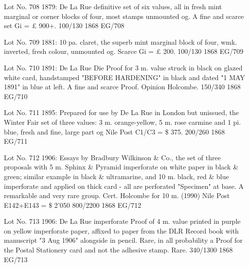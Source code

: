 \documentclass[justified]{tufte-book}
\begin{document}
%
{Lot No. 708
1879: De La Rue definitive set of six values, all in fresh mint marginal or corner blocks of four, most stamps unmounted og. A fine and scarce set Gi = £ 900+. 100/130
}%
{1868}%
{EG/708}%
{}%
{}
{}%
{}

%
{Lot No. 709
1881: 10 pa. claret, the superb mint marginal block of four, wmk. inverted, fresh colour, unmounted og. Scarce Gi = £ 200. 100/130
}%
{1868}%
{EG/709}%
{}%
{}
{}%
{}

%
{Lot No. 710
1891: De La Rue Die Proof for 3 m. value struck in black on glazed white card, handstamped "BEFORE HARDENING" in black and dated "1 MAY 1891" in blue at left. A fine and scarce Proof. Opinion Holcombe. 150/340
}%
{1868}%
{EG/710}%
{}%
{}
{}%
{}

%
{
Lot No. 711
1895: Prepared for use by De La Rue in London but unissued, the Winter Fair set of three values: 3 m. orange-yellow, 5 m. rose carmine and 1 pi. blue, fresh and fine, large part og Nile Post C1/C3 = \$ 375. 200/260
}%
{1868}%
{EG/711}%
{}%
{}
{}%
{}

%
{Lot No. 712
1906: Essays by Bradbury Wilkinson \& Co., the set of three proposals with 5 m. Sphinx \& Pyramid imperforate on white paper in black \& green; similar example in black \& ultramarine, and 10 m. black, red \& blue imperforate and applied on thick card - all are perforated "Specimen" at base. A remarkable and very rare group. Cert. Holcombe for 10 m. (1990) Nile Post E142+E143 = \$ 2'050 800/2200
}%
{1868}%
{EG/712}%
{}%
{}
{}%
{}

%
{Lot No. 713
1906: De La Rue imperforate Proof of 4 m. value printed in purple on yellow imperforate paper, affixed to paper from the DLR Record book with manuscript "3 Aug 1906" alongside in pencil. Rare, in all probability a Proof for the Postal Stationery card and not the adhesive stamp. Rare. 340/1300
}%
{1868}%
{EG/713}%
{}%
{}
{}%
{}

\end{document}
